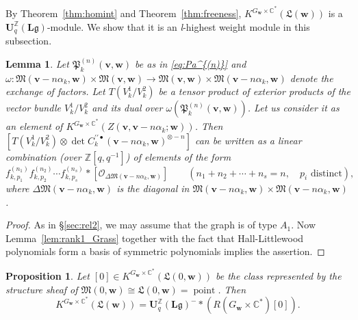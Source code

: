 \documentclass[12pt]{amsart}
\def\Bbb{\mathbb}
\def\frak{\mathfrak}
\newcommand{\rom}{\textup}
\newtheorem{Lemma}[equation]{Lemma}
\newtheorem{Proposition}[equation]{Proposition}
\theoremstyle{definition}
\theoremstyle{remark}
\numberwithin{equation}{subsection}
\newcommand{\thmref}[1]{Theorem~\ref{#1}}
\newcommand{\secref}[1]{\S\ref{#1}}
\newcommand{\lemref}[1]{Lemma~\ref{#1}}
\newcommand{\C}{{\Bbb C}}
\newcommand{\Z}{{\Bbb Z}}
\newcommand{\M}{{\frak M}} %
\newcommand{\La}{{\frak L}} %
\newcommand{\bv}{{\mathbf v}} %
\newcommand{\bw}{{\mathbf w}} %
\newcommand{\Uli}{{\mathbf U}^{\Z}_q({\mathbf L}\mathfrak g)}
\newcommand{\Pa}{{\frak P}} %
\newcommand{\shfO}{\mathcal O}
\newcommand{\Law}{\La(\bw)}
\begin{document}
By \thmref{thm:homint} and \thmref{thm:freeness},
$K^{G_\bw\times\C^*}(\Law)$ is a $\Uli$-module. We show that it is an
{\it l\/}-highest weight module in this subsection.

\begin{Lemma}\label{lem:e's}
Let $\Pa_k^{(n)}(\bv,\bw)$ be as in \eqref{eq:Pa^{(n)}} and 
$\omega\colon \M(\bv-n\alpha_k,\bw)\times \M(\bv,\bw)
\to \M(\bv,\bw)\times \M(\bv-n\alpha_k,\bw)$ denote the exchange of
factors.
%
Let $T(V^1_k/V^2_k)$ be a tensor product of exterior products of the
vector bundle $V^1_k/V^2_k$ and its dual over
$\omega(\Pa_k^{(n)}(\bv,\bw))$.
%
Let us consider it as an element of
$K^{G_\bw\times\C^*}(Z(\bv,\bv-n\alpha_k;\bw))$.
%
Then
\(\left[
  T(V_k^1/V_k^2)\otimes
  \det C_k^{\prime\prime\bullet}(\bv-n\alpha_k,\bw)^{\otimes -n}
\right]\)
can be written as a linear combination
\rom(over $\Z[q,q^{-1}]$\rom) of elements of the form
\begin{equation*}
   f_{k,p_1}^{(n_1)} f_{k,p_2}^{(n_2)} \cdots
   f_{k,p_s}^{(n_s)} \ast [\shfO_{\Delta\M(\bv-n\alpha_k,\bw)}]
   \qquad(n_1+n_2+\cdots+n_s = n,\quad \text{$p_i$ distinct}),
\end{equation*}
where $\Delta\M(\bv-n\alpha_k,\bw)$ is the diagonal in
$\M(\bv-n\alpha_k,\bw)\times\M(\bv-n\alpha_k,\bw)$.
\end{Lemma}

\begin{proof}
As in \secref{sec:rel2}, we may assume that the graph is of type
$A_1$. Now \lemref{lem:rank1_Grass} together with the fact that
Hall-Littlewood polynomials form a basis of symmetric polynomials
implies the assertion.
\end{proof}

\begin{Proposition}\label{prop:Lw}
Let $[0]\in K^{G_\bw\times\C^*}(\La(0,\bw))$ be the class represented
by the structure sheaf of $\M(0,\bw)\cong \La(0,\bw) =
\operatorname{point}$. Then
\begin{equation*}
 K^{G_\bw\times\C^*}(\Law)
 = \Uli^-\ast \left(R(G_\bw\times\C^*)[0]\right).
\end{equation*}
\end{Proposition}
\end{document}
